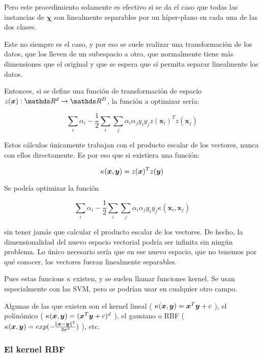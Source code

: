Pero este procedimiento solamente es efectivo si se da el caso que todas las
instancias de $\bm{\chi}$ son linealmente separables por un híper-plano en cada
una de las dos clases.

Este no siempre es el caso, y por eso se suele realizar una transformación de los
datos, que los lleven de un subespacio a otro, que normalmente tiene más dimensiones
que el original y que se espera que sí permita separar linealmente los datos.

Entonces, si se define una función de transformación de espacio
$z(\bm{x}) : \reals^d \rightarrow \reals^D$, la función a optimizar sería:

\begin{equation}
 \sum_i\alpha_i - \frac{1}{2}\sum_i\sum_j\alpha_i\alpha_jy_iy_jz(\bm{x}_i)^Tz(\bm{x}_j)
\end{equation}

Estos cálculos únicamente trabajan con el producto escalar de los vectores, nunca
con ellos directamente. Es por eso que si existiera una función:

\begin{equation}
 \kappa(\bm{x}, \bm{y}) = z(\bm{x})^Tz(\bm{y})
\end{equation}

Se podría optimizar la función

\begin{equation}
 \sum_i\alpha_i - \frac{1}{2}\sum_i\sum_j\alpha_i\alpha_jy_iy_j\kappa(\bm{x}_i, \bm{x}_j)
\end{equation}

sin tener jamás que calcular el producto escalar de los vectores. De hecho, la
dimensionalidad del nuevo espacio vectorial podría ser infinita sin ningún problema.
Lo único necesario sería que en ese nuevo espacio, que no tenemos por qué conocer,
los vectores fueran linealmente separables.

Pues estas funcions $\kappa$ existen, y se suelen llamar funciones kernel. Se usan
especialmente con las SVM, pero se podrían usar en cualquier otro campo.

Algunas de las que existen son el kernel lineal (
$\kappa(\bm{x}, \bm{y}) = \bm{x}^T\bm{y} + c$
), el polinómico (
$\kappa(\bm{x}, \bm{y}) = (\bm{x}^T\bm{y} + c)^d$
), el gausiano o RBF (
$\kappa(\bm{x}, \bm{y}) = exp(-\frac{\norm{\bm{x} - \bm{y}}^2}{2\sigma^2})$
), etc.

\subsubsection{El kernel RBF}

